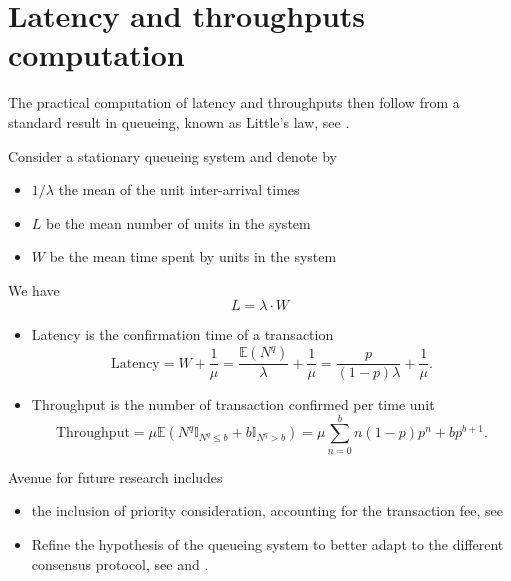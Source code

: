 \section{Latency and throughputs computation}\label{sec:latency_throughputs}
The practical computation of latency and throughputs then follow from a standard result in queueing, known as Little's law, see \citet{Little1961}.
\begin{theo}
Consider a stationary queueing system and denote by 
\begin{itemize}
  \item $1/\lambda$ the mean of the unit inter-arrival times
  \item $L$ be the mean number of units in the system
  \item $W$ be the mean time spent by units in the system
\end{itemize}
We have
$$
L = \lambda \cdot W
$$
\end{theo}
\begin{itemize}
  \item Latency is the confirmation time of a transaction 
    $$
    \text{Latency} = W + \frac{1}{\mu} = \frac{\mathbb{E}(N^q)}{\lambda} + \frac{1}{\mu} =  \frac{p}{(1-p)\lambda} + \frac{1}{\mu}.
    $$
  \item Throughput is the number of transaction confirmed per time unit
  $$
    \text{Throughput} = \mu\mathbb{E}(N^q\mathbb{I}_{N^q\leq b}+b\mathbb{I}_{N^q> b}) = \mu\sum_{n = 0}^bn(1-p)p^n + bp^{b+1}.
  $$
\end{itemize}
Avenue for future research includes 
\begin{itemize}
	\item the inclusion of priority consideration, accounting for the transaction fee, see \citet{Kawase2020}
	\item Refine the hypothesis of the queueing system to better adapt to the different consensus protocol, see \citet{Li2018} and \citet{Li2019}.
\end{itemize}
\newpage